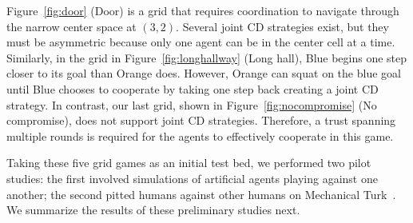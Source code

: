 Figure~\ref{fig:door} (Door) is a grid that requires coordination to
navigate through the narrow center space at $(3,2)$. Several joint CD
strategies exist, but they must be asymmetric because only one agent
can be in the center cell at a time. Similarly, in the grid in
Figure~\ref{fig:longhallway} (Long hall), Blue begins one step closer
to its goal than Orange does.  However, Orange can squat on the blue
goal until Blue chooses to cooperate by taking one step back creating
a joint CD strategy. In contrast, our last grid, shown in
Figure~\ref{fig:nocompromise} (No compromise), does not support joint
CD strategies. Therefore, a trust spanning multiple rounds is required
for the agents to effectively cooperate in this game.

Taking these five grid games as an initial test bed, we performed two
pilot studies: the first involved simulations of artificial agents
playing against one another; the second pitted humans against other
humans on Mechanical Turk~\cite{austerweil16}.  We summarize the
results of these preliminary studies next.

